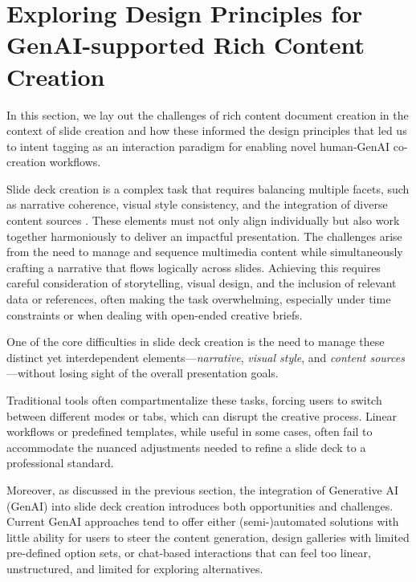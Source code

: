 \section{Exploring Design Principles for GenAI-supported Rich Content Creation}

In this section, we lay out the challenges of rich content document creation in the context of slide creation and how these informed the design principles that led us to intent tagging as an interaction paradigm for enabling novel human-GenAI co-creation workflows.

Slide deck creation is a complex task that requires balancing multiple facets, such as narrative coherence, visual style consistency, and the integration of diverse content sources \cite{yates_powerpoint_2007, reynolds_presentation_2020, anholt_dazzle_2006}. 
These elements must not only align individually but also work together harmoniously to deliver an impactful presentation. The challenges arise from the need to manage and sequence multimedia content while simultaneously crafting a narrative that flows logically across slides. Achieving this requires careful consideration of storytelling, visual design, and the inclusion of relevant data or references, often making the task overwhelming, especially under time constraints or when dealing with open-ended creative briefs.


One of the core difficulties in slide deck creation is the need to manage these distinct yet interdependent elements—\textit{narrative}, \textit{visual style}, and \textit{content sources}—without losing sight of the overall presentation goals. 

Traditional tools often compartmentalize these tasks, forcing users to switch between different modes or tabs, which can disrupt the creative process. Linear workflows or predefined templates, while useful in some cases, often fail to accommodate the nuanced adjustments needed to refine a slide deck to a professional standard.

Moreover, as discussed in the previous section, the integration of Generative AI (GenAI) into slide deck creation introduces both opportunities and challenges. Current GenAI approaches tend to offer either (semi-)automated solutions with little ability for users to steer the content generation, design galleries with limited pre-defined option sets, or chat-based interactions that can feel too linear, unstructured, and limited for exploring alternatives.




